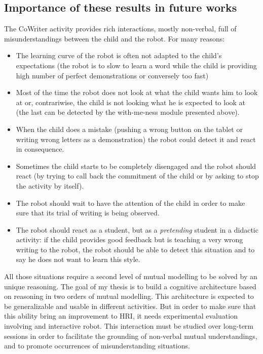 \documentclass[10pt,a4paper]{article}
\begin{document}
\subsection{Importance of these results in future works}
The CoWriter activity provides rich interactions, mostly non-verbal, full of misunderstandings between the child and the robot. For many reasons:
\begin{itemize}

\item The learning curve of the robot is often not adapted to the child's expectations (the robot is to slow to learn a word while the child is providing high number of perfect demonstrations or conversely too fast)
\item Most of the time the robot does not look at what the child wants him to look at or, contrariwise, the child is not looking what he is expected to look at (the last can be detected by the with-me-ness module presented above). 
\item When the child does a mistake (pushing a wrong button on the tablet or writing wrong letters as a demonstration) the robot could detect it and react in consequence.
\item Sometimes the child starts to be completely disengaged and the robot should react (by trying to call back the commitment of the child or by asking to stop the activity by itself).
\item The robot should wait to have the attention of the child in order to make sure that its trial of writing is being observed.
\item The robot should react as a student, but as a \textit{pretending} student in a didactic activity: if the child provides good feedback but is teaching a very wrong writing to the robot, the robot should be able to detect this situation and to say he does not want to learn this style. 

\end{itemize}
All those situations require a second level of mutual modelling to be solved by an unique reasoning.
The goal of my thesis is to build a cognitive architecture based on reasoning in two orders of mutual modelling. This architecture is expected to be generalizable and usable in different activities. But in order to make sure that this ability bring an improvement to HRI, it needs experimental evaluation involving  and interactive robot. 
This interaction must be studied over long-term sessions in order to facilitate the grounding of non-verbal mutual understandings, and to promote occurrences of misunderstanding situations. 
\end{document}
